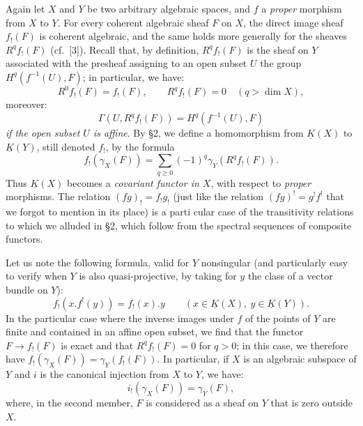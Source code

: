 Again let $X$ and $Y$ be two arbitrary algebraic spaces, and $f$ a \emph{proper} morphism from $X$ to $Y$. For every coherent algebraic sheaf $F$ on $X$, the direct image sheaf $f_!(F)$ is coherent algebraic, and the same holds more generally for the sheaves $R^qf_!(F)$ (cf.\ [3]). Recall that, by definition, $R^qf_!(F)$ is the sheaf on $Y$ associated with the presheaf assigning to an open subset $U$ the group $H^q(f^{-1}(U),F)$; in particular, we have:
\begin{equation}\tag{2.24}
 R^0f_!(F)=f_!(F),\qquad R^qf_!(F)=0\quad(q>\dim X),
\end{equation}
moreover:
\begin{equation}\tag{2.25}
 \Gamma(U,R^qf_!(F))=H^q(f^{-1}(U),F)
\end{equation}
\emph{if the open subset $U$ is affine}. By \S 2, we define a homomorphism from $\underline K(X)$ to $\underline K(Y)$, still denoted $f_!$, by the formula
\begin{equation}\tag{2.26}
 f_!(\gamma_X(F))=\sum_{q\geq0}(-1)^q\gamma_Y(R^qf_!(F)).
\end{equation}
Thus $\underline K(X)$ becomes a \emph{covariant functor in $X$}, with respect to \emph{proper} morphisms. The relation $(fg)_!=f_!g_!$ (just like the relation $(fg)^!=g^!f^!$ that we forgot to mention in its place) is a parti%
%
cular case of the transitivity relations to which we alluded in \S 2, which follow from the spectral sequences of composite functors.

Let us note the following formula, valid for $Y$ nonsingular (and particularly easy to verify when $Y$ is also quasi-projective, by taking for $y$ the class of a vector bundle on $Y$):
\begin{equation}\tag{2.27}
 f_!(x.f^!(y))=f_!(x).y\qquad(x\in\underline K(X),\ y\in\underline K(Y)).
\end{equation}
In the particular case where the inverse images under $f$ of the points of $Y$ are finite and contained in an affine open subset, we find that the functor $F\longrightarrow f_!(F)$ is exact and that $R^qf_!(F)=0$ for $q>0$; in this case, we therefore have $f_!(\gamma_X(F))=\gamma_Y(f_!(F))$. In particular, if $X$ is an algebraic subspace of $Y$ and $i$ is the canonical injection from $X$ to $Y$, we have:
\begin{equation}\tag{2.28}
 i_!(\gamma_X(F))=\gamma_Y(F),
\end{equation}
where, in the second member, $F$ is considered as a sheaf on $Y$ that is zero outside $X$.

